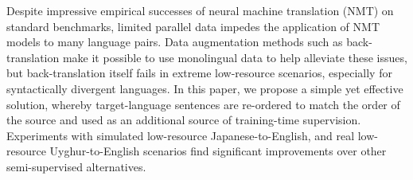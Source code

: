 Despite impressive empirical successes of neural machine translation (NMT) on standard benchmarks, limited parallel data impedes the application of NMT models to many language pairs.
Data augmentation methods such as back-translation make it possible to use monolingual data to help alleviate these issues, but back-translation itself fails in extreme low-resource scenarios, especially for syntactically divergent languages.
In this paper, we propose a simple yet effective solution, whereby target-language sentences are re-ordered to match the order of the source and used as an additional source of training-time supervision.
Experiments with simulated low-resource Japanese-to-English, and real low-resource Uyghur-to-English scenarios find significant improvements over other semi-supervised alternatives.
